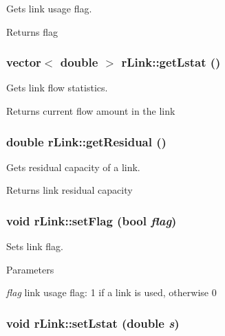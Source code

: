 Gets link usage flag. 

\begin{DoxyReturn}{Returns}
flag 
\end{DoxyReturn}
\hypertarget{classrLink_a86c80f0a22f7703601d8a242c2fb471f}{
\subsubsection[{getLstat}]{\setlength{\rightskip}{0pt plus 5cm}vector$<$ double $>$ rLink::getLstat ()}}
\label{classrLink_a86c80f0a22f7703601d8a242c2fb471f}


Gets link flow statistics. 

\begin{DoxyReturn}{Returns}
current flow amount in the link 
\end{DoxyReturn}
\hypertarget{classrLink_aa840b5668425c224a451ec1663754a82}{
\subsubsection[{getResidual}]{\setlength{\rightskip}{0pt plus 5cm}double rLink::getResidual ()}}
\label{classrLink_aa840b5668425c224a451ec1663754a82}


Gets residual capacity of a link. 

\begin{DoxyReturn}{Returns}
link residual capacity 
\end{DoxyReturn}
\hypertarget{classrLink_a15022659ea92d086138f817203ede689}{
\subsubsection[{setFlag}]{\setlength{\rightskip}{0pt plus 5cm}void rLink::setFlag (bool {\em flag})}}
\label{classrLink_a15022659ea92d086138f817203ede689}


Sets link flag. 


\begin{DoxyParams}{Parameters}
\item[{\em flag}]link usage flag: 1 if a link is used, otherwise 0 \end{DoxyParams}
\hypertarget{classrLink_a719c8cee2887f566dd4e0ca6df81f0de}{
\subsubsection[{setLstat}]{\setlength{\rightskip}{0pt plus 5cm}void rLink::setLstat (double {\em s})}}
\label{classrLink_a719c8cee2887f566dd4e0ca6df81f0de}


